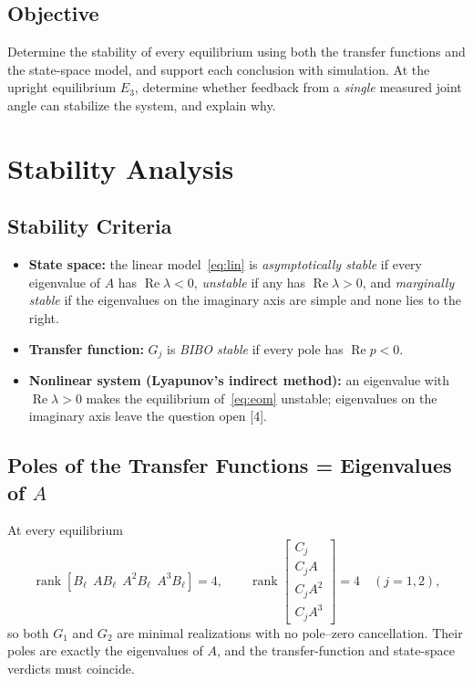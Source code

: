 \documentclass[12pt,a4paper]{article}
\begin{document}
\subsection{Objective}
Determine the stability of every equilibrium using both the transfer functions and the state-space model, and support each conclusion with simulation. At the upright equilibrium $E_3$, determine whether feedback from a \emph{single} measured joint angle can stabilize the system, and explain why.

\section{Stability Analysis}
\subsection{Stability Criteria}
\begin{itemize}
\item \textbf{State space:} the linear model~\eqref{eq:lin} is \emph{asymptotically stable} if every eigenvalue of $A$ has $\operatorname{Re}\lambda<0$, \emph{unstable} if any has $\operatorname{Re}\lambda>0$, and \emph{marginally stable} if the eigenvalues on the imaginary axis are simple and none lies to the right.
\item \textbf{Transfer function:} $G_j$ is \emph{BIBO stable} if every pole has $\operatorname{Re}p<0$.
\item \textbf{Nonlinear system (Lyapunov's indirect method):} an eigenvalue with $\operatorname{Re}\lambda>0$ makes the equilibrium of~\eqref{eq:eom} unstable; eigenvalues on the imaginary axis leave the question open [4].
\end{itemize}

\subsection{Poles of the Transfer Functions = Eigenvalues of $A$}
At every equilibrium
\[
\operatorname{rank}[B_\ell\ \ AB_\ell\ \ A^2B_\ell\ \ A^3B_\ell]=4,\qquad
\operatorname{rank}\begin{bmatrix}C_j\\C_jA\\C_jA^2\\C_jA^3\end{bmatrix}=4\quad(j=1,2),
\]
so both $G_1$ and $G_2$ are minimal realizations with no pole--zero cancellation. Their poles are exactly the eigenvalues of $A$, and the transfer-function and state-space verdicts must coincide.
\end{document}
